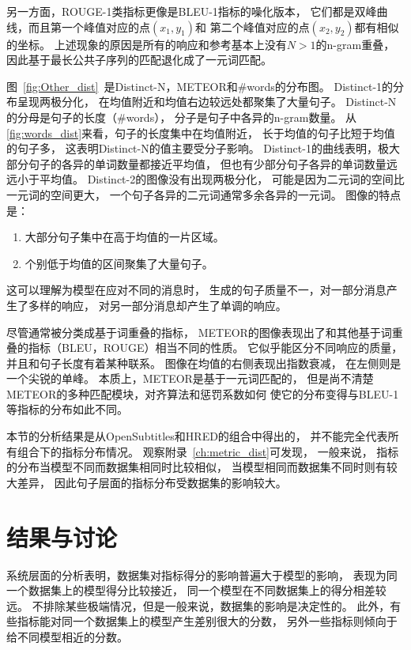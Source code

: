 另一方面，ROUGE-1类指标更像是BLEU-1指标的噪化版本，
它们都是双峰曲线，而且第一个峰值对应的点$(x_1, y_1)$和
第二个峰值对应的点$(x_2, y_2)$都有相似的坐标。
上述现象的原因是所有的响应和参考基本上没有$N > 1$的n-gram重叠，
因此基于最长公共子序列的匹配退化成了一元词匹配。

图~\ref{fig:Other_dist}~是Distinct-N，METEOR和\#words的分布图。
Distinct-1的分布呈现两极分化，
在均值附近和均值右边较远处都聚集了大量句子。
Distinct-N的分母是句子的长度（\#words），
分子是句子中各异的n-gram数量。
从\ref{fig:words_dist}来看，句子的长度集中在均值附近，
长于均值的句子比短于均值的句子多，
这表明Distinct-N的值主要受分子影响。
Distinct-1的曲线表明，极大部分句子的各异的单词数量都接近平均值，
但也有少部分句子各异的单词数量远远小于平均值。
Distinct-2的图像没有出现两极分化，
可能是因为二元词的空间比一元词的空间更大，
一个句子各异的二元词通常多余各异的一元词。
图像的特点是：
\begin{enumerate}
    \item 大部分句子集中在高于均值的一片区域。
    \item 个别低于均值的区间聚集了大量句子。
\end{enumerate}
这可以理解为模型在应对不同的消息时，
生成的句子质量不一，对一部分消息产生了多样的响应，
对另一部分消息却产生了单调的响应。


尽管通常被分类成基于词重叠的指标，
METEOR的图像表现出了和其他基于词重叠的指标（BLEU，ROUGE）相当不同的性质。
它似乎能区分不同响应的质量，并且和句子长度有着某种联系。
图像在均值的右侧表现出指数衰减， 在左侧则是一个尖锐的单峰。
本质上，METEOR是基于一元词匹配的，
但是尚不清楚METEOR的多种匹配模块，对齐算法和惩罚系数如何
使它的分布变得与BLEU-1等指标的分布如此不同。

本节的分析结果是从OpenSubtitles和HRED的组合中得出的，
并不能完全代表所有组合下的指标分布情况。
观察附录~\ref{ch:metric_dist}可发现， 一般来说，
指标的分布当模型不同而数据集相同时比较相似，
当模型相同而数据集不同时则有较大差异，
因此句子层面的指标分布受数据集的影响较大。

\section{结果与讨论}\label{sec:result_and_discussion}
系统层面的分析表明，数据集对指标得分的影响普遍大于模型的影响，
表现为同一个数据集上的模型得分比较接近，
同一个模型在不同数据集上的得分相差较远。
不排除某些极端情况，但是一般来说，数据集的影响是决定性的。
此外，有些指标能对同一个数据集上的模型产生差别很大的分数，
另外一些指标则倾向于给不同模型相近的分数。

